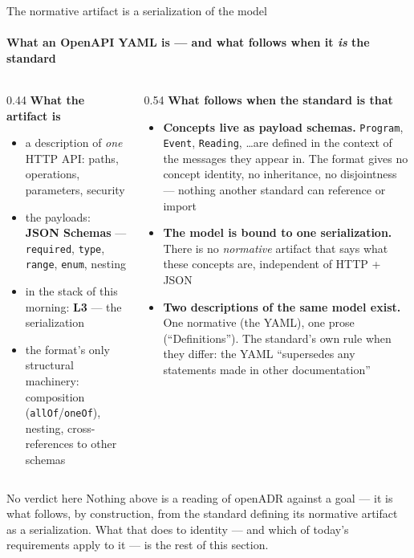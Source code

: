 \begin{frame}{The normative artifact is a serialization of the model}
  \framesubtitle{What an OpenAPI YAML is — and what follows when it \emph{is} the standard}

  \begin{columns}[T]
    \begin{column}{0.44\textwidth}
      \textbf{What the artifact is}\\[0.3em]
      \begin{itemize}\scriptsize
        \item a description of \emph{one} HTTP API: paths, operations,
              parameters, security
        \item the payloads: \textbf{JSON Schemas} — \texttt{required},
              \texttt{type}, \texttt{range}, \texttt{enum}, nesting
        \item in the stack of this morning: \textbf{L3} — the serialization
        \vspace{0.25em}
        \item the format's only structural machinery: composition
              (\texttt{allOf}/\texttt{oneOf}), nesting, cross-references
              to other schemas
      \end{itemize}
    \end{column}
    \begin{column}{0.54\textwidth}
      \textbf{What follows when the standard is that}\\[0.3em]
      \begin{itemize}\scriptsize
        \item \textbf{Concepts live as payload schemas.} \texttt{Program},
              \texttt{Event}, \texttt{Reading}, \ldots are defined in the
              context of the messages they appear in. The format gives no
              concept identity, no inheritance, no disjointness — nothing
              another standard can reference or import
        \item \textbf{The model is bound to one serialization.} There is no
              \emph{normative} artifact that says what these concepts are,
              independent of HTTP + JSON
        \item \textbf{Two descriptions of the same model exist.} One
              normative (the YAML), one prose (``Definitions''). The
              standard's own rule when they differ: the YAML
              ``supersedes any statements made in other documentation''
      \end{itemize}
    \end{column}
  \end{columns}

  \vspace{0.25em}
  \begin{alertblock}{No verdict here}
    Nothing above is a reading of openADR against a goal — it is what
    follows, by construction, from the standard defining its normative
    artifact as a serialization. What that does to identity — and which
    of today's requirements apply to it — is the rest of this section.
  \end{alertblock}
\end{frame}
